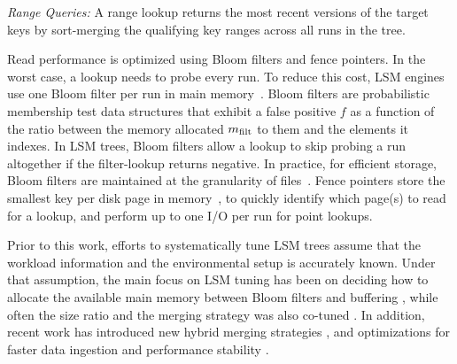 \emph{Range Queries:}
A range lookup returns the most recent versions of the target keys 
by sort-merging the qualifying key ranges across all runs in the tree.

Read performance is optimized using Bloom filters and fence pointers. 
In the worst case, a lookup 
needs to probe every run. To reduce this cost, 
LSM engines use one Bloom filter per run in main memory~\cite{Dayan2017, FacebookRocksDB}. 
Bloom filters \cite{Bloom1970} are probabilistic membership test data structures
    that exhibit a false positive $f$ as a function of the ratio between the
    memory allocated ${{m_{\mathrm{filt}}}}$ to them and the elements it indexes.
In LSM trees, Bloom filters allow a lookup to skip probing a run altogether if
    the filter-lookup returns negative.
In practice, for efficient storage, Bloom filters are maintained at the
    granularity of files~\cite{Dong2017}. 
Fence pointers store the smallest key per disk page in memory~\cite{Dayan2017},
    to quickly identify which page(s) to read for a lookup, and perform up to
    one I/O per run for point lookups.


Prior to this work, efforts to systematically tune LSM trees assume that the
    workload information and the environmental setup is accurately known.
Under that assumption, the main focus on LSM tuning has been on deciding how to
allocate the available main memory between Bloom filters and buffering
\cite{Dayan2017,Kim2020,Luo2020a}, while often the size ratio and the merging
strategy was also co-tuned \cite{Dayan2018a}.  In addition, recent work has
introduced new hybrid merging strategies \cite{Dayan2018,Dayan2019,Sarkar2021c},
and optimizations for faster data ingestion \cite{Luo2019b} and performance
stability
\cite{Luo2019a}.

